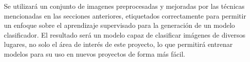 Se utilizará un conjunto de imagenes preprocesadas y mejoradas por las técnicas mencionadas en las secciones
anteriores, etiquetados correctamente para permitir un enfoque sobre el aprendizaje supervisado para la generación de
un modelo clasificador. El resultado será un modelo capaz de clasificar imágenes de diversos lugares, no solo el área
de interés de este proyecto, lo que permitirá entrenar modelos para su uso en nuevos proyectos de forma más fácil.
